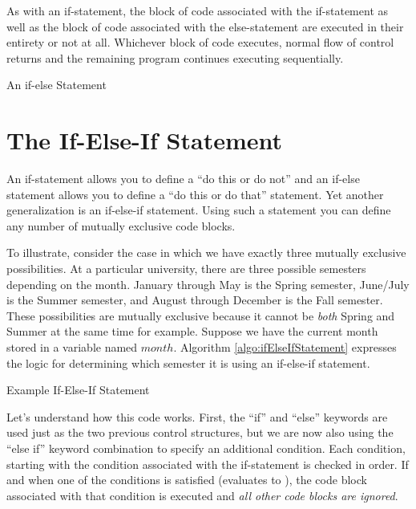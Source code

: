 As with an if-statement, the block of code associated with the if-statement as
well as the block of code associated with the else-statement are executed
in their entirety or not at all.  Whichever block of code executes, normal flow
of control returns and the remaining program continues executing sequentially.

\begin{algorithm}[h]
\caption{An if-else Statement}
\label{algo:ifElseStatement}
\end{algorithm}

\section{The If-Else-If Statement}

An if-statement allows you to define a ``do this or do not'' and an if-else statement
allows you to define a ``do this or do that'' statement.  Yet another generalization is
an if-else-if statement.  Using such a statement you can define any number of
mutually exclusive code blocks.  

To illustrate, consider the case in which we have exactly three mutually exclusive
possibilities.  At a particular university, there are three possible semesters depending
on the month.  January through May is the Spring semester, June/July is the Summer
semester, and August through December is the Fall semester.  These possibilities
are mutually exclusive because it cannot be \emph{both} Spring and Summer at the
same time for example.  Suppose we have the current month stored in a variable
named $month$.  Algorithm \ref{algo:ifElseIfStatement} expresses the logic
for determining which semester it is using an if-else-if statement.

\begin{algorithm}[H]
\caption{Example If-Else-If Statement}
\label{algo:ifElseIfStatement}
\end{algorithm}

Let's understand how this code works.  First, the ``if'' and ``else'' keywords
are used just as the two previous control structures, but we are now also
using the ``else if'' keyword combination to specify an additional condition.
Each condition, starting with the condition associated with the if-statement 
is checked in order.  If and when one of the conditions is satisfied (evaluates 
to \True), the code block associated with that condition is executed and 
\emph{all other code blocks are ignored}.  

